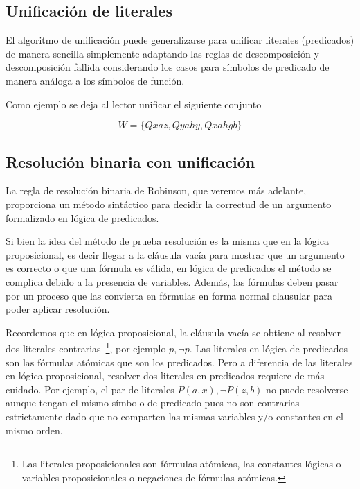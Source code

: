 \documentclass[11pt,letterpaper]{article}
\begin{document}
\subsection{Unificación de literales}

El algoritmo de unificación puede generalizarse para unificar literales 
(predicados) de manera sencilla simplemente adaptando las reglas de 
descomposición y descomposición fallida considerando los casos para símbolos de 
predicado de manera análoga a los símbolos de función.

Como ejemplo se deja al lector unificar el siguiente conjunto

\[
W=\{Qxaz,Qyahy,Qxahgb\}
\]



\subsection{Resolución binaria con unificación}


La regla de resolución binaria de Robinson, que veremos más adelante, 
proporciona un método sint\'actico para decidir la correctud de un argumento 
formalizado en lógica de predicados. 

\smallskip

Si bien la idea del método de prueba resolución es la misma que en la lógica 
proposicional, es decir llegar a la cláusula vacía para mostrar que un argumento 
es correcto o que una fórmula es válida, en lógica de predicados el método se 
complica debido a la presencia de variables. Adem\'as, las f\'ormulas deben pasar por un proceso que las convierta en f\'ormulas en forma normal clausular para poder aplicar resolución.

\bigskip

Recordemos que en lógica proposicional, la cl\'ausula vac\'ia se obtiene al 
resolver dos literales contrarias~\footnote{Las literales proposicionales son 
fórmulas atómicas, las constantes l\'ogicas o variables  proposicionales o 
negaciones de fórmulas atómicas.}, por ejemplo $p,\neg p$.
% 
Las literales en lógica de predicados son las fórmulas atómicas que son los 
predicados.
Pero a diferencia de las literales en lógica proposicional, resolver dos 
literales en predicados requiere de m\'as cuidado.
Por ejemplo, el par de literales $P(a,x), \neg P(z,b)$ no puede resolverse 
aunque tengan el mismo símbolo de predicado pues no son contrarias 
estrictamente dado que no comparten las mismas variables y/o constantes en el 
mismo orden.
\end{document}
